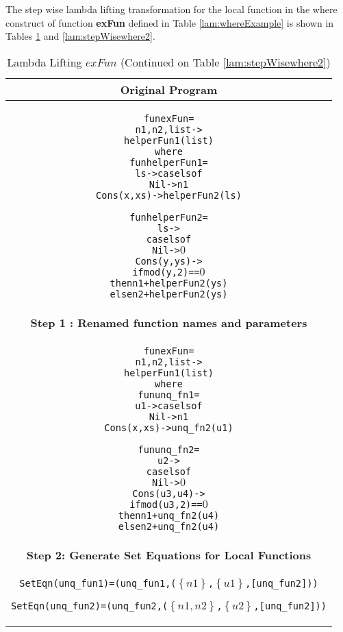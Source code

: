 \documentclass[11pt]{article}
\begin{document}
The step wise lambda lifting transformation for the local function in the {\sf where} construct of function {\bf exFun} defined in Table \ref {lam:whereExample} is shown in Tables \ref {lam:stepWisewhere1} and  \ref {lam:stepWisewhere2}.

\begin{table}[h!]
\begin{center}
\begin{tabular}{|c|} \hline
{\bf Original Program}\\ 
\hline
\begin{minipage}{4in}
\begin{alltt}


  fun exFun = 
    n1,n2,list -> 
        helperFun1 (list)
      where
        fun helperFun1 = 
            ls -> case ls of 
                    Nil -> n1
                    Cons(x,xs) -> helperFun2(ls)

        fun helperFun2 =
            ls -> 
              case ls of
                Nil -> \(0\)
                Cons(y,ys) ->
                  if mod(y,2) == \(0\) 
                    then n1 + helperFun2(ys)
                    else n2 + helperFun2(ys) 

\end{alltt} 
\end {minipage} \\ 
\hline 
{\bf Step 1 : Renamed function names and parameters }\\ 
\hline
\begin{minipage}{4in}
\begin{alltt}


  fun exFun = 
    n1,n2,list -> 
        helperFun1 (list)
      where
        fun unq_fn1 = 
          u1 -> case ls of 
                  Nil -> n1
                  Cons(x,xs) -> unq_fn2(u1)

        fun unq_fn2 =
          u2 -> 
            case ls of
              Nil -> \(0\)
              Cons(u3,u4) ->
                if mod(u3,2) == \(0\) 
                  then n1 + unq_fn2(u4)
                  else n2 + unq_fn2(u4) 

\end{alltt} 
\end {minipage}\\ 
\hline 
{\bf Step 2: Generate Set Equations for Local Functions}\\ 
\hline 
\begin{minipage}{4in}
\begin{alltt}


SetEqn(unq_fun1) = (unq_fun1,(\(\left\{n1\right\}\),\(\left\{u1\right\}\),[unq_fun2]))

SetEqn(unq_fun2) = (unq_fun2,(\(\left\{n1,n2\right\}\),\(\left\{u2\right\}\),[unq_fun2]))

\end{alltt} 
\end {minipage}
\tabularnewline
\hline
\end{tabular}
\caption{Lambda Lifting $exFun$ (Continued on Table \ref {lam:stepWisewhere2})}
\label{lam:stepWisewhere1}
\end{center}
\end{table}
\end{document}
